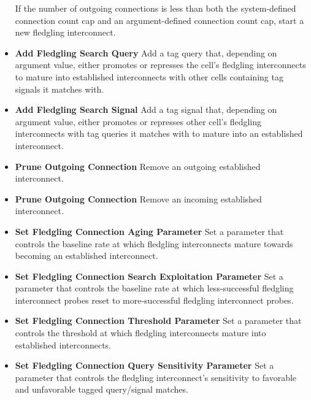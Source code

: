 \begin{itemize}
If the number of outgoing connections is less than both the system-defined connection count cap and an argument-defined connection count cap, start a new fledgling interconnect.
\item \textbf{Add Fledgling Search Query}
Add a tag query that, depending on argument value, either promotes or represses the cell's fledgling interconnects to mature into established interconnects with other cells containing tag signals it matches with.
\item \textbf{Add Fledgling Search Signal}
Add a tag signal that, depending on argument value, either promotes or represses other cell's fledgling interconnects with tag queries it matches with to mature into an established interconnect.
\item \textbf{Prune Outgoing Connection}
Remove an outgoing established interconnect.
\item \textbf{Prune Outgoing Connection}
Remove an incoming established interconnect.
\item \textbf{Set Fledgling Connection Aging Parameter}
Set a parameter that controls the baseline rate at which fledgling interconnects mature towards becoming an established interconnect.
\item \textbf{Set Fledgling Connection Search Exploitation Parameter}
Set a parameter that controls the baseline rate at which less-successful fledgling interconnect probes reset to more-successful fledgling interconnect  probes.
\item \textbf{Set Fledgling Connection Threshold Parameter}
Set a parameter that controls the threshold at which fledgling interconnects mature into established interconnects.
\item \textbf{Set Fledgling Connection Query Sensitivity Parameter}
Set a parameter that controls the fledgling interconnect's sensitivity to favorable and unfavorable tagged query/signal matches.
\end{itemize}


